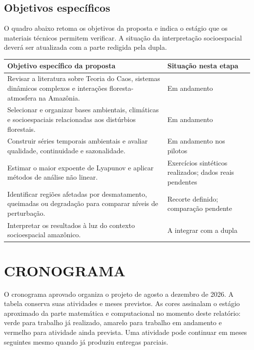 \documentclass[12pt,a4paper]{article}
\begin{document}
\subsection*{Objetivos específicos}

O quadro abaixo retoma os objetivos da proposta e indica o estágio que os materiais técnicos permitem verificar. A situação da interpretação socioespacial deverá ser atualizada com a parte redigida pela dupla.

\small
\renewcommand{\arraystretch}{1.22}
\begin{tabularx}{\textwidth}{|X|p{3.15cm}|}\hline
Objetivo específico da proposta & Situação nesta etapa\\\hline
Revisar a literatura sobre Teoria do Caos, sistemas dinâmicos complexos e interações floresta-atmosfera na Amazônia. & Em andamento\\\hline
Selecionar e organizar bases ambientais, climáticas e socioespaciais relacionadas aos distúrbios florestais. & Em andamento\\\hline
Construir séries temporais ambientais e avaliar qualidade, continuidade e sazonalidade. & Em andamento nos pilotos\\\hline
Estimar o maior expoente de Lyapunov e aplicar métodos de análise não linear. & Exercícios sintéticos realizados; dados reais pendentes\\\hline
Identificar regiões afetadas por desmatamento, queimadas ou degradação para comparar níveis de perturbação. & Recorte definido; comparação pendente\\\hline
Interpretar os resultados à luz do contexto socioespacial amazônico. & A integrar com a dupla\\\hline
\end{tabularx}
\normalsize

\section*{CRONOGRAMA}

O cronograma aprovado organiza o projeto de agosto a dezembro de 2026. A tabela conserva suas atividades e meses previstos. As cores assinalam o estágio aproximado da parte matemática e computacional no momento deste relatório: verde para trabalho já realizado, amarelo para trabalho em andamento e vermelho para atividade ainda prevista. Uma atividade pode continuar em meses seguintes mesmo quando já produziu entregas parciais.
\end{document}
